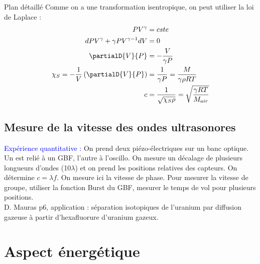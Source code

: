 \begin{reportBlock}{Plan détaillé}
  Comme on a une transformation isentropique, on peut utiliser la loi de Laplace :
  \begin{align*}
      PV^{\gamma} &= cste \\
      dPV^{\gamma} + \gamma PV^{\gamma-1}dV &= 0 \\
      \partialD{V}{P} &= -\frac{V}{\gamma P} \\
      \chi_S = -\frac{1}{V}\left( \partialD{V}{P}\right) &= \frac{1}{\gamma P} = \frac{M}{\gamma\rho RT} \\
      c &= \frac{1}{\sqrt{\chi_S\rho}}=\sqrt{\frac{\gamma RT}{M_{air}}}
  \end{align*}
  
  \subsection{Mesure de la vitesse des ondes ultrasonores}
  \textcolor{blue}{Expérience quantitative :} On prend deux piézo-électriques sur un banc optique. Un est relié à un GBF, l'autre à l'oscillo. On mesure un décalage de plusieurs longueurs d'ondes (10$\lambda$) et on prend les positions relatives des capteurs. On détermine $c=\lambda f$. On mesure ici la vitesse de phase. Pour mesurer la vitesse de groupe, utiliser la fonction Burst du GBF, mesurer le temps de vol pour plusieurs positions.\\

  D. Mauras p6, application : séparation isotopiques de l'uranium par diffusion gazeuse à partir d'hexafluorure d'uranium gazeux.
  
  \section{Aspect énergétique}
  


\end{reportBlock}